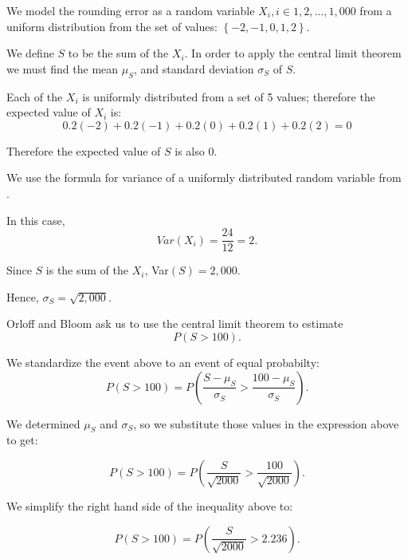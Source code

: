 \documentclass[a5paper,11pt]{article}
\begin{document}
We model the rounding error as a random
variable $X_i, i \in 1, 2, \ldots, 1,000$ from a uniform distribution
from the set of values: 
$\left\{-2,-1,0,1,2 \right\}$.


We define $S$ to be the sum of the $X_i$.
In order to apply the central limit theorem
we must find the mean $\mu_S$, and standard
deviation $\sigma_S$ of $S$.

Each of the $X_i$ is uniformly distributed from a set 
of 5 values; therefore the expected value
of $X_i$ is:
\begin{equation}
0.2\left(-2 \right) +
0.2\left( -1 \right) +
0.2\left( 0  \right) +
0.2\left( 1 \right) +
0.2\left( 2 \right) =
0
\end{equation}

Therefore the expected value of $S$ is also 0.

We use the formula for variance of a
uniformly distributed random variable 
from \cite{reading5a}. 

In this case, 
\begin{equation}
Var\left(X_i \right) =
\frac{24}{12} = 2. 
\end{equation}

Since $S$ is the sum of the $X_i$, Var$\left(S \right)=2,000$.

Hence, $\sigma_S = \sqrt{2,000}$.

Orloff and Bloom ask us to use the central limit theorem to estimate
\begin{equation}
P\left(S > 100 \right).
\end{equation}

We standardize the event above to an event of equal probabilty:
\begin{equation}
P\left(S > 100 \right)=
P\left(\frac{S-\mu_S}{\sigma_S} > 
\frac{100 - \mu_S}{\sigma_S} \right).
\end{equation}

We determined $\mu_S$ and $\sigma_S$, so
we substitute those values in the
expression above to get:

\begin{equation}
P\left(S > 100 \right)=
P\left(\frac{S}{\sqrt{2000}} > 
\frac{100}{\sqrt{2000}} \right).
\end{equation}

We simplify the right hand side of the
inequality above to:

\begin{equation}
P\left(S > 100 \right)=
P\left(\frac{S}{\sqrt{2000}} > 
2.236 \right).
\end{equation}
\end{document}
